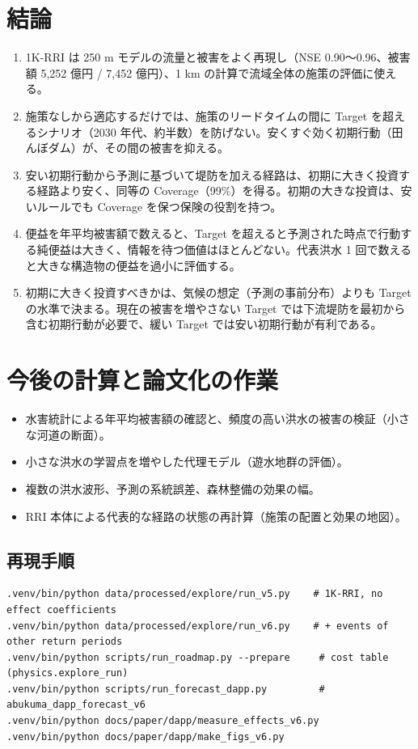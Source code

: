 \documentclass[a4paper,10pt]{ltjsarticle}
\begin{document}
\section{結論}
\begin{enumerate}
  \item 1K-RRI は 250 m モデルの流量と被害をよく再現し（NSE 0.90〜0.96、被害額 5,252 億円 / 7,452 億円）、1 km の計算で流域全体の施策の評価に使える。
  \item 施策なしから適応するだけでは、施策のリードタイムの間に Target を超えるシナリオ（2030 年代、約半数）を防げない。安くすぐ効く初期行動（田んぼダム）が、その間の被害を抑える。
  \item 安い初期行動から予測に基づいて堤防を加える経路は、初期に大きく投資する経路より安く、同等の Coverage（99\%）を得る。初期の大きな投資は、安いルールでも Coverage を保つ保険の役割を持つ。
  \item 便益を年平均被害額で数えると、Target を超えると予測された時点で行動する純便益は大きく、情報を待つ価値はほとんどない。代表洪水 1 回で数えると大きな構造物の便益を過小に評価する。
  \item 初期に大きく投資すべきかは、気候の想定（予測の事前分布）よりも Target の水準で決まる。現在の被害を増やさない Target では下流堤防を最初から含む初期行動が必要で、緩い Target では安い初期行動が有利である。
\end{enumerate}

\section{今後の計算と論文化の作業}
\label{sec:next}
\begin{itemize}
  \item 水害統計による年平均被害額の確認と、頻度の高い洪水の被害の検証（小さな河道の断面）。
  \item 小さな洪水の学習点を増やした代理モデル（遊水地群の評価）。
  \item 複数の洪水波形、予測の系統誤差、森林整備の効果の幅。
  \item RRI 本体による代表的な経路の状態の再計算（施策の配置と効果の地図）。
\end{itemize}

\subsection*{再現手順}
\begin{verbatim}
.venv/bin/python data/processed/explore/run_v5.py    # 1K-RRI, no effect coefficients
.venv/bin/python data/processed/explore/run_v6.py    # + events of other return periods
.venv/bin/python scripts/run_roadmap.py --prepare     # cost table (physics.explore_run)
.venv/bin/python scripts/run_forecast_dapp.py         # abukuma_dapp_forecast_v6
.venv/bin/python docs/paper/dapp/measure_effects_v6.py
.venv/bin/python docs/paper/dapp/make_figs_v6.py
\end{verbatim}
\end{document}
